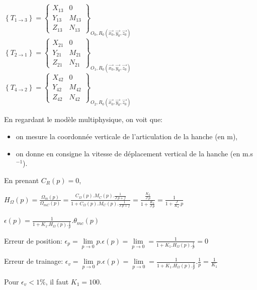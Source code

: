 $\left\{T_{1\rightarrow 3}\right\}=\left\{\begin{array}{cc}
X_{13} & 0 \\
Y_{13} & M_{13} \\
Z_{13} & N_{13}
\end{array}\right\}_{O_0,R_0(\overrightarrow{x_0},\overrightarrow{y_0},\overrightarrow{z_0})}$
$\left\{T_{2\rightarrow 1}\right\}=\left\{\begin{array}{cc}
X_{21} & 0 \\
Y_{21} & M_{21} \\
Z_{21} & N_{21}
\end{array}\right\}_{O_1,R_0(\overrightarrow{x_0},\overrightarrow{y_0},\overrightarrow{z_0})}$
$\left\{T_{4\rightarrow 2}\right\}=\left\{\begin{array}{cc}
X_{42} & 0 \\
Y_{42} & M_{42} \\
Z_{42} & N_{42}
\end{array}\right\}_{O_2,R_0(\overrightarrow{x_0},\overrightarrow{y_0},\overrightarrow{z_0})}$

\cor

En regardant le modèle multiphysique, on voit que:
\begin{itemize}
 \item on mesure la coordonnée verticale de l'articulation de la hanche (en m),
 \item on donne en consigne la vitesse de déplacement vertical de la hanche (en m.s$^{-1}$).
\end{itemize}

\cor

En prenant $C_R(p)=0$,

$H_\Omega(p)=\frac{\Omega_m(p)}{\Omega_{mC}(p)}=\frac{C_\Omega(p).M_C(p).\frac{1}{J.p+f}}{1+C_\Omega(p).M_C(p).\frac{1}{J.p+f}}=\frac{\frac{K_2}{J.p}}{1+\frac{K_2}{J.p}}=\frac{1}{1+\frac{J}{K_2}.p}$

\cor

$\epsilon(p)=\frac{1}{1+K_1.H_\Omega(p).\frac{1}{p}}.\theta_{mc}(p)$

\cor

Erreur de position: $\epsilon_p=\lim\limits_{p\rightarrow 0}p.\epsilon(p)=\lim\limits_{p\rightarrow 0}=\frac{1}{1+K_1.H_\Omega(p).\frac{1}{p}}=0$

Erreur de trainage: $\epsilon_v=\lim\limits_{p\rightarrow 0}p.\epsilon(p)=\lim\limits_{p\rightarrow 0}=\frac{1}{1+K_1.H_\Omega(p).\frac{1}{p}}.\frac{1}{p}=\frac{1}{K_1}$

Pour $\epsilon_v<1\%$, il faut $K_1=100$.

